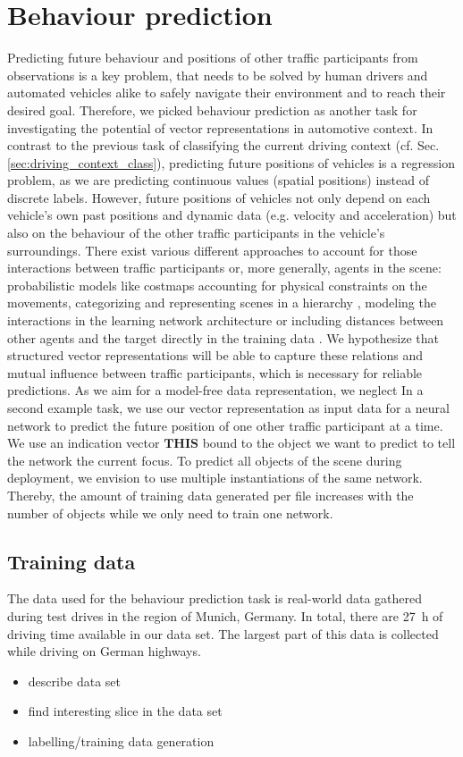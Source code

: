 \section{Behaviour prediction}
Predicting future behaviour and positions of other traffic participants from observations is a key problem, that needs to be solved by human drivers and automated vehicles alike to safely navigate their environment and to reach their desired goal.
Therefore, we picked behaviour prediction as another task for investigating the potential of vector representations in automotive context.
In contrast to the previous task of classifying the current driving context (cf. Sec. \ref{sec:driving_context_class}), predicting future positions of vehicles is a regression problem, as we are predicting continuous values (spatial positions) instead of discrete labels.
However, future positions of vehicles not only depend on each vehicle's own past positions and dynamic data (e.g. velocity and acceleration) but also on the behaviour of the other traffic participants in the vehicle's surroundings.
There exist various different approaches to account for those interactions between traffic participants or, more generally, agents in the scene: probabilistic models like costmaps \cite{Bahram2016} accounting for physical constraints on the movements, categorizing and representing scenes in a hierarchy \cite{Bonnin2012}, modeling the interactions in the learning network architecture \cite{Alahi2016} or including distances between other agents and the target directly in the training data \cite{Altche2018}.
We hypothesize that structured vector representations will be able to capture these relations and mutual influence between traffic participants, which is necessary for reliable predictions.
As we aim for a model-free data representation, we neglect 
In a second example task, we use our vector representation as input data for a neural network to predict the future position of one other traffic participant at a time.
We use an indication vector $\mathbf{THIS}$ bound to the object we want to predict to tell the network the current focus.
To predict all objects of the scene during deployment, we envision to use multiple instantiations of the same network.
Thereby, the amount of training data generated per file increases with the number of objects while we only need to train one network.
\subsection{Training data}
The data used for the behaviour prediction task is real-world data gathered during test drives in the region of Munich, Germany.
In total, there are \SI{27}{\hour} of driving time available in our data set.
The largest part of this data is collected while driving on German highways.
\begin{itemize}
	\item describe data set
	\item find interesting slice in the data set
	\item labelling/training data generation
\end{itemize}
